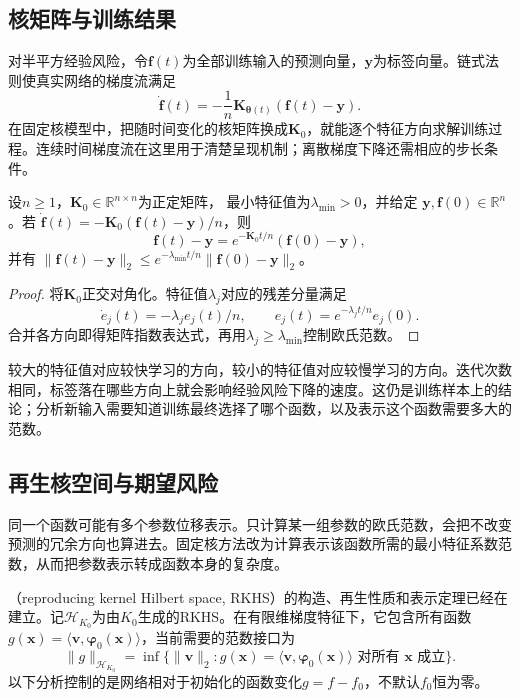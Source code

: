 \subsection{核矩阵与训练结果}

对半平方经验风险，令$\bm f(t)$为全部训练输入的预测向量，$\bm y$为标签向量。链式法则使真实网络的梯度流满足
\[
 \dot{\bm f}(t)=-\frac1n\bm K_{\bm\theta(t)}(\bm f(t)-\bm y).
\]
在固定核模型中，把随时间变化的核矩阵换成$\bm K_0$，就能逐个特征方向求解训练过程。连续时间梯度流在这里用于清楚呈现机制；离散梯度下降还需相应的步长条件。

\begin{theorem}[固定NTK下的训练收敛]
\label{thm:ntk-training-convergence}
设$n\geq1$，$\bm K_0\in\mathbb R^{n\times n}$为正定矩阵，
最小特征值为$\lambda_{\min}>0$，并给定
$\bm y,\bm f(0)\in\mathbb R^n$。若
$\dot{\bm f}(t)=-\bm K_0(\bm f(t)-\bm y)/n$，则
\[
 \bm f(t)-\bm y=e^{-\bm K_0t/n}(\bm f(0)-\bm y),
\]
并有
$\|\bm f(t)-\bm y\|_2\leq e^{-\lambda_{\min}t/n}\|\bm f(0)-\bm y\|_2$。
\end{theorem}
\begin{proof}
将$\bm K_0$正交对角化。特征值$\lambda_j$对应的残差分量满足
\[
 \dot e_j(t)=-\lambda_j e_j(t)/n,\qquad
 e_j(t)=e^{-\lambda_jt/n}e_j(0).
\]
合并各方向即得矩阵指数表达式，再用$\lambda_j\geq\lambda_{\min}$控制欧氏范数。
\end{proof}

较大的特征值对应较快学习的方向，较小的特征值对应较慢学习的方向。迭代次数相同，标签落在哪些方向上就会影响经验风险下降的速度。这仍是训练样本上的结论；分析新输入需要知道训练最终选择了哪个函数，以及表示这个函数需要多大的范数。

\subsection{再生核空间与期望风险}
\label{sec:ntk-rkhs-generalization}

同一个函数可能有多个参数位移表示。只计算某一组参数的欧氏范数，会把不改变预测的冗余方向也算进去。固定核方法改为计算表示该函数所需的最小特征系数范数，从而把参数表示转成函数本身的复杂度。

（reproducing kernel Hilbert space, RKHS）的构造、再生性质和表示定理已经在
建立。记$\mathcal H_{K_0}$为由$K_0$生成的RKHS。在有限维梯度特征下，它包含所有函数
$g(\bm x)=\langle\bm v,\bm\varphi_0(\bm x)\rangle$，当前需要的范数接口为
\[
 \|g\|_{\mathcal H_{K_0}}
 =\inf\{\|\bm v\|_2:g(\bm x)=\langle\bm v,\bm\varphi_0(\bm x)\rangle
                         \text{ 对所有 }\bm x\text{ 成立}\}.
\]
以下分析控制的是网络相对于初始化的函数变化$g=f-f_0$，不默认$f_0$恒为零。

